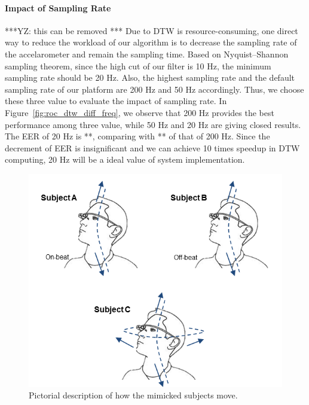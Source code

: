 \paragraph{Impact of Sampling Rate}
***YZ: this can be removed ***
Due to DTW is resource-consuming, one direct way to reduce the workload of our algorithm is to decrease the sampling rate of the accelarometer and remain the sampling time. Based on Nyquist–Shannon sampling theorem, since the high cut of our filter is 10 Hz, the minimum sampling rate should be 20 Hz. Also, the highest sampling rate and the default sampling rate of our platform are 200 Hz and 50 Hz accordingly. Thus, we choose these three value to evaluate the impact of sampling rate.  In Figure~\ref{fig:roc_dtw_diff_freq}, we observe that 200 Hz provides the best performance among three value, while 50 Hz and 20 Hz are giving closed results. The EER of 20 Hz is **, comparing with  ** of that of 200 Hz. Since the decrement of EER is insignificant and we can achieve 10 times speedup in DTW computing,  20 Hz will be a ideal value of system implementation.
\begin{figure}
\centering
\includegraphics[width = \columnwidth]{figure/imitation_subject_movement.png}
\caption{\label{fig:imitation_movement} Pictorial description of how the mimicked subjects move.}
\end{figure}

